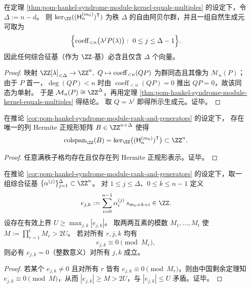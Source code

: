 \begin{corollary}[综合征基的秩与自然生成元]\label{cor:pom-hankel-syndrome-module-rank-and-generators}
在定理 \ref{thm:pom-hankel-syndrome-module-kernel-equals-multiples} 的设定下，令 \(\Delta:=n-d\)。
则 \(\ker_{\ZZ}((\mathsf H^{(m_0)}_{n})^{\mathsf T})\) 为秩 \(\Delta\) 的自由阿贝尔群，并且一组自然生成元可取为
\[
\Bigl\{\operatorname{coeff}_{<n}\bigl(\lambda^j P(\lambda)\bigr):\ 0\le j\le \Delta-1\Bigr\}.
\]
因此任何综合征基（作为 \(\ZZ\)-基）必含且仅含 \(\Delta\) 个向量。
\end{corollary}
\begin{proof}
映射
\(
\ZZ[\lambda]_{<\Delta}\to\ZZ^n,\ Q\mapsto \operatorname{coeff}_{<n}(QP)
\)
为群同态且其像为 \(\mathcal{M}_n(P)\)；
由于 \(P\) 首一，\(\deg(QP)<n\) 时由 \(\operatorname{coeff}_{<n}(QP)=0\) 推出 \(QP=0\)，故该同态为单射。
于是 \(\mathcal{M}_n(P)\cong \ZZ^\Delta\)，再用定理 \ref{thm:pom-hankel-syndrome-module-kernel-equals-multiples} 得结论。
取 \(Q=\lambda^j\) 即得所示生成元。证毕。
\end{proof}

\begin{corollary}\label{cor:pom-hankel-syndrome-hnf-unique}
在推论 \ref{cor:pom-hankel-syndrome-module-rank-and-generators} 的设定下，
存在唯一的列 Hermite 正规形矩阵 \(B\in\ZZ^{n\times\Delta}\) 使得
\[
\operatorname{colspan}_{\ZZ}(B)=\ker_{\ZZ}\bigl((\mathsf H^{(m_0)}_{n})^{\mathsf T}\bigr)\subset\ZZ^n.
\]
\end{corollary}
\begin{proof}
任意满秩子格均存在且仅存在列 Hermite 正规形表示。证毕。
\end{proof}

\begin{proposition}[多模数离线审计的确定性完备性]\label{prop:pom-hankel-syndrome-crt-offline-audit}
在推论 \ref{cor:pom-hankel-syndrome-module-rank-and-generators} 的设定下，取一组综合征基
\(\{\alpha^{(j)}\}_{j=1}^{\Delta}\subset\ZZ^n\)。
对 \(1\le j\le\Delta\)、\(0\le k\le n-1\) 定义
\[
e_{j,k}:=\sum_{i=0}^{n-1}\alpha^{(j)}_{i}\,s_{m_0+k+i}\in\ZZ.
\]
设存在有效上界 \(U\ge \max_{j,k}|e_{j,k}|\)。
取两两互素的模数 \(M_1,\dots,M_t\) 使 \(M:=\prod_{r=1}^{t}M_r>2U\)。
若对所有 \(r,j,k\) 均有
\[
e_{j,k}\equiv 0\pmod{M_r},
\]
则必有 \(e_{j,k}=0\)（整数意义）对所有 \(j,k\) 成立。
\end{proposition}
\begin{proof}
若某个 \(e_{j,k}\neq 0\) 且对所有 \(r\) 皆有 \(e_{j,k}\equiv 0\pmod{M_r}\)，则由中国剩余定理知 \(e_{j,k}\equiv 0\pmod{M}\)，从而 \(|e_{j,k}|\ge M>2U\)，与 \(|e_{j,k}|\le U\) 矛盾。证毕。
\end{proof}

